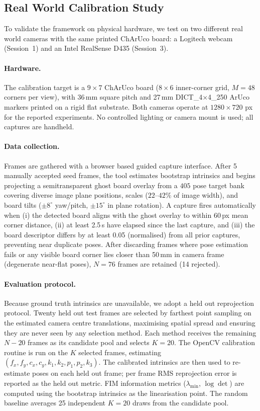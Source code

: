 \documentclass[letterpaper, 9
 pt, conference]{ieeeconf}
\begin{document}
\FloatBarrier

\subsection{Real World Calibration Study}
\label{subsec:real_world}

To validate the framework on physical hardware, we test on two different
real world cameras with the same printed ChArUco board: a Logitech webcam
(Session~1) and an Intel RealSense D435 (Session~3).

\paragraph{Hardware.}
The calibration target is a $9{\times}7$ ChArUco board
($8{\times}6$ inner-corner grid, $M{=}48$ corners per view),
with 36\,mm square pitch and 27\,mm DICT\_4$\times$4\_250 ArUco markers
printed on a rigid flat substrate.
Both cameras operate at $1280{\times}720$ px for the reported experiments.
No controlled lighting or camera mount is used; all captures are handheld.

\paragraph{Data collection.}
Frames are gathered with a browser based guided capture interface.
After 5 manually accepted seed frames, the tool estimates bootstrap
intrinsics and begins projecting a semitransparent ghost board overlay from a
$405$ pose target bank covering diverse image plane positions, scales ($22$--$42\%$
of image width), and board tilts ($\pm 8^\circ$ yaw/pitch, $\pm 15^\circ$ in plane rotation).
A capture fires automatically when (i) the detected board aligns with the
ghost overlay to within 60\,px mean corner distance,
(ii) at least 2.5\,s have elapsed since the last capture, and
(iii) the board descriptor differs by at least 0.05 (normalised) from all
prior captures, preventing near duplicate poses.
After discarding frames where pose estimation fails or any visible board
corner lies closer than 50\,mm in camera frame (degenerate near-flat poses),
$N{=}76$ frames are retained (14 rejected).

\paragraph{Evaluation protocol.}
Because ground truth intrinsics are unavailable, we adopt a held out
reprojection protocol.
Twenty held out test frames are selected by farthest point sampling on the
estimated camera centre translations, maximising spatial spread and ensuring
they are never seen by any selection method.
Each method receives the remaining $N{-}20$ frames as its candidate pool and
selects $K{=}20$.
The OpenCV calibration routine is run on the $K$ selected frames, estimating
$(f_x,f_y,c_x,c_y,k_1,k_2,p_1,p_2,k_3)$.
The calibrated intrinsics are then used to re-estimate poses on
each held out frame; per frame RMS reprojection error is reported as the
held out metric.
FIM information metrics ($\lambda_{\min}$, $\log\det$) are computed using
the bootstrap intrinsics as the linearisation point.
The random baseline averages 25 independent $K{=}20$ draws from the candidate pool.
\end{document}
